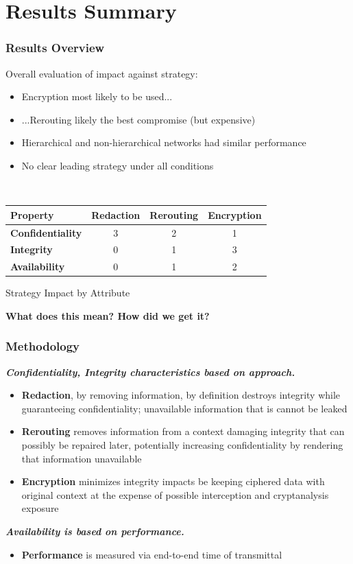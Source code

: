 \documentclass[t,handout]{beamer}
\begin{document}
\section{Results Summary}

\begin{frame}
\frametitle{Results Overview}
Overall evaluation of impact against strategy:
\begin{itemize}
\item {\small Encryption most likely to be used...}
\item {\small ...Rerouting likely the best compromise (but expensive)}
\item {\small Hierarchical and non-hierarchical networks had similar performance}
\item {\small No clear leading strategy under all conditions}
\end{itemize}
~\\
\centering %
\begin{tabular}{lccc}
\toprule %
{\bf Property}			& {\bf Redaction}	& {\bf Rerouting} 	& {\bf Encryption} 	\\\toprule
{\bf Confidentiality} 	& 3				  	& 2					& 1				 	\\\midrule
{\bf Integrity}			& 0					& 1					& 3 					\\\midrule
{\bf Availability}		& 0					& 1					& 2					\\\bottomrule
\end{tabular}
\label{table:model:evaluation}
\begin{center}
{\small Strategy Impact by Attribute}
\end{center}
\begin{center}
{\bf What does this mean? How did we get it?}
\end{center}
\end{frame}

\begin{frame}
\frametitle{Methodology}
{\bf \textit{Confidentiality, Integrity characteristics based on approach.}} \\
\begin{itemize}
\item {\small {\bf Redaction}, by removing information, by definition destroys integrity while guaranteeing confidentiality; unavailable information that is cannot be leaked}
\item {\small {\bf Rerouting} removes information from a context damaging integrity that can possibly be repaired later, potentially increasing confidentiality by rendering that information unavailable}
\item {\small {\bf Encryption} minimizes integrity impacts be keeping ciphered data with original context at the expense of possible interception and cryptanalysis exposure}
\end{itemize}
{\bf \textit{Availability is based on performance.}} \\
\begin{itemize}
\item {\small {\bf Performance} is measured via end-to-end time of transmittal}
\end{itemize}
\end{frame}
\end{document}

